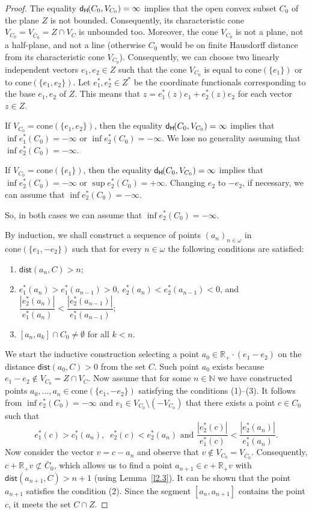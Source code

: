 \documentclass{amsart}
\newcommand{\IR}{\mathbb R}
\newcommand{\IN}{\mathbb N}
\newcommand{\cone}{\mathrm{cone}}
\newcommand{\w}{\omega}
\newcommand{\dist}{\mathsf{dist}}
\newcommand{\dH}{\mathsf{d}_{\mathsf H}\kern-1pt}
\theoremstyle{definition}
\begin{document}
\begin{proof} The equality $\dH(C_0,V_{C_0})=\infty$ implies that
the open convex subset $C_0$ of the plane $Z$ is not bounded. Consequently, its characteristic cone $V_{C_0}=V_{\bar C_0}=Z\cap V_C$ is unbounded too. Moreover, the cone $V_{C_0}$ is not a plane, not a half-plane, and not a line (otherwise $C_0$ would be on finite Hausdorff distance from its characteristic cone $V_{C_0}$). Consequently, we can choose two linearly independent vectors $e_1,e_2\in Z$ such that the cone $V_{C_0}$ is equal to $\cone(\{e_1\})$ or to  $\cone(\{e_1,e_2\})$. Let $e_1^*,e_2^*\in Z^*$ be the coordinate functionals corresponding to the base $e_1,e_2$ of $Z$. This means that $z=e_1^*(z)e_1+e_2^*(z)e_2$ for each vector $z\in Z$.

If $V_{C_0}=\cone(\{e_1,e_2\})$, then the equality $\dH(C_0,V_{C_0})=\infty$ implies that $\inf e_1^*(C_0)=-\infty$ or $\inf e_2^*(C_0)=-\infty$. We lose no generality assuming that $\inf e_2^*(C_0)=-\infty$.

If $V_{C_0}=\cone(\{e_1\})$, then the equality $\dH(C_0,V_{C_0})=\infty$ implies that $\inf e_2^*(C_0)=-\infty$ or $\sup e_2^*(C_0)=+\infty$. Changing $e_2$ to $-e_2$, if necessary, we can assume that $\inf e_2^*(C_0)=-\infty$.

So, in both cases we can assume that $\inf e_2^*(C_0)=-\infty$.

By induction, we shall construct a sequence of points $(a_n)_{n\in\w}$ in $\cone(\{e_1,-e_2\})$ such that for every $n\in\w$ the following conditions are satisfied:
\begin{enumerate}
\item $\dist(a_n,C)>n$;
\item $e_1^*(a_{n})>e_1^*(a_{n-1})>0$, $e_2^*(a_n)<e_2^*(a_{n-1})<0$, and $\dfrac{|e_2^*(a_n)|}{e_1^*(a_n)}<\dfrac{|e_2^*(a_{n-1})|}{e_1^*(a_{n-1})}$;
\item $[a_n,a_{k}]\cap C_0\ne\emptyset$ for all $k<n$.
\end{enumerate}

We start the inductive construction selecting a point $a_0\in\IR_+\cdot(e_1-e_2)$ on the distance $\dist(a_0,C)>0$ from the set $C$. Such point $a_0$ exists because $e_1-e_2\notin V_{C_0}=Z\cap V_C$. Now assume that for some $n\in\IN$ we have constructed points $a_0,\dots,a_n\in\cone(\{e_1,-e_2\})$ satisfying the conditions (1)--(3). It follows from $\inf e_2^*(C_0)=-\infty$ and $e_1\in V_{C_0}\setminus(-V_{C_0})$ that there exists a point $c\in C_0$ such that $$e^*_1(c)>c_1^*(a_n),\;\;e^*_2(c)<e^*_2(a_n)\mbox{ \ and \ }\frac{|e^*_2(c)|}{e^*_1(c)}<\frac{|e^*_2(a_n)|}{e^*_1(a_n)}.$$
Now consider the vector $v=c-a_n$ and observe that $v\notin V_{C_0}=V_{\bar C_0}$. Consequently, $c+\IR_+v\not\subset \bar C_0$, which allows us to find a point $a_{n+1}\in c+\IR_+ v$ with $\dist(a_{n+1},C)>n+1$ (using Lemma~\ref{l2.3}). It can be shown that the point $a_{n+1}$ satisfies the condition (2). Since the segment $[a_n,a_{n+1}]$ contains the point $c$, it  meets the set $C\cap Z$.


\end{proof}
\end{document}
